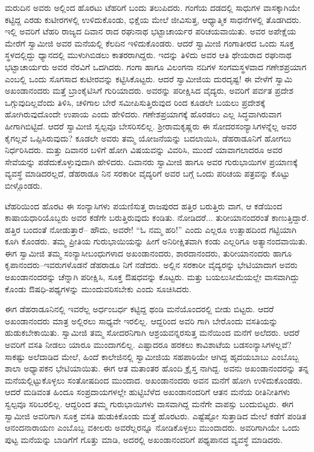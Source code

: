 ಮರುದಿನ ಅವರು ಅಲ್ಲಿಂದ ಹೊರಟು ಟೆಹರಿಗೆ ಬಂದು ತಲುಪಿದರು. ಗಂಗೆಯ ದಡದಲ್ಲಿ ಸಾಧುಗಳ ವಾಸಕ್ಕಾಗಿಯೇ ಕಟ್ಟಿದ್ದ ಎರಡು ಕುಟೀರಗಳಲ್ಲಿ ಉಳಿದುಕೊಂಡು, ಭಿಕ್ಷೆಯ ಮೇಲೆ ಜೀವಿಸುತ್ತ, ಆಧ್ಯಾತ್ಮಿಕ ಸಾಧನೆಗಳಲ್ಲಿ ತೊಡಗಿದರು. ಇಲ್ಲಿ ಅವರಿಗೆ ಟೆಹರಿ ರಾಜ್ಯದ ದಿವಾನ ರಾದ ರಘುನಾಥ ಭಟ್ಟಾಚಾರ್ಯರ ಪರಿಚಯವಾಯಿತು. ಅವರ ಅಪೇಕ್ಷೆಯ ಮೇರೆಗೆ ಸ್ವಾಮೀಜಿ ಅವರ ಮನೆಯಲ್ಲಿ ಕೆಲದಿನ ಇಳಿದುಕೊಂಡರು. ಆದರೆ ಸ್ವಾಮೀಜಿ ಗಂಗಾತೀರದ ಒಂದು ಸೂಕ್ತ ಸ್ಥಳದಲ್ಲಿದ್ದು ಧ್ಯಾನದಲ್ಲಿ ಮುಳುಗಿಬಿಡಲು ಕಾತರರಾಗಿದ್ದರು. ಇದನ್ನು ತಿಳಿದು ಅವರ ಆತಿ ಥೇಯರಾದ ರಘುನಾಥ ಭಟ್ಟಾಚಾರ್ಯರು ಅವರ ನೆರವಿಗೆ ಒದಗಿದರು. ಗಂಗಾ ಹಾಗೂ ವಿಲಂಗನಾ ನದಿಗಳ ಸಂಗಮಸ್ಥಳವಾದ ಗಣೇಶಪ್ರಯಾಗ ಎಂಬಲ್ಲಿ ಒಂದು ಸೊಗಸಾದ ಕುಟೀರವನ್ನು ಕಟ್ಟಿಸಿಕೊಟ್ಟರು. ಆದರೆ ಸ್ವಾಮೀಜಿಯ ದುರದೃಷ್ಟ! ಈ ವೇಳೆಗೆ ಸ್ವಾಮಿ ಅಖಂಡಾನಂದರು ಮತ್ತೆ ಬ್ರಾಂಕೈಟಿಸಿಗೆ ಗುರಿಯಾದರು. ಅವರನ್ನು ಪರೀಕ್ಷಿಸಿದ ವೈದ್ಯರು, ಅವರಿಗೆ ಪರ್ವತ ಪ್ರದೇಶ ಒಗ್ಗುವುದಿಲ್ಲವೆಂದು ತಿಳಿಸಿ, ಚಳಿಗಾಲ ಬೇರೆ ಸಮೀಪಿಸುತ್ತಿರುವುದ ರಿಂದ ಕೂಡಲೇ ಬಯಲು ಪ್ರದೇಶಕ್ಕೆ ಹೋಗಿರುವುದೊಂದೇ ಉಪಾಯ ಎಂದು ಹೇಳಿದರು. ಗಣೇಶಪ್ರಯಾಗಕ್ಕೆ ಹೊರಡಲು ಎಲ್ಲ ಸಿದ್ಧವಾಗಿರುವಾಗ ಹೀಗಾಗಿಬಿಟ್ಟಿದೆ. ಆದರೆ ಸ್ವಾಮೀಜಿ ಸ್ವಲ್ಪವೂ ಬೇಸರಿಸಲಿಲ್ಲ. ಶ್ರೀರಾಮಕೃಷ್ಣರು ಈ ಸೋದರಸಂನ್ಯಾಸಿಗಳನ್ನೆಲ್ಲ ಅವರ ಕೈಗಲ್ಲವೆ ಒಪ್ಪಿಸಿರುವುದು? ಕೂಡಲೇ ಅವರು ತಮ್ಮ ಯೋಜನೆಯನ್ನು ಬದಲಾಯಿಸಿ, ಡೆಹರಾಡೂನಿಗೆ ಹೋಗಲು ನಿರ್ಧರಿಸಿದರು. ಮತ್ತು ದಿವಾನರ ಬಳಿಗೆ ಹೋಗಿ ವಿಷಯವನ್ನು ವಿವರಿಸಿ, ಮುಂದೆ ಯಾವಾಗಲಾದರೂ ಅವರ ಸೇವೆಯನ್ನು ಪಡೆದುಕೊಳ್ಳುವುದಾಗಿ ಹೇಳಿದರು. ದಿವಾನರು ಸ್ವಾಮೀಜಿ ಹಾಗೂ ಅವರ ಗುರುಭಾಯಿಗಳ ಪ್ರಯಾಣಕ್ಕೆ ವ್ಯವಸ್ಥೆ ಮಾಡಿದರಲ್ಲದೆ, ಡೆಹರಾಡೂ ನಿನ ಸರಕಾರೀ ವೈದ್ಯರಿಗೆ ಅವರ ಬಗ್ಗೆ ಒಂದು ಪರಿಚಯ ಪತ್ರವನ್ನು ಕೊಟ್ಟು ಬೀಳ್ಗೊಂಡರು.

ಟೆಹರಿಯಿಂದ ಹೊರಟ ಈ ಸಂನ್ಯಾಸಿಗಳು ಪಯಣಿಸುತ್ತ ರಾಜಪುರದ ಹತ್ತಿರ ಬರುತ್ತಿರು ವಾಗ, ಆ ಕಡೆಯಿಂದ ಕಾಷಾಯಧಾರಿಯೊಬ್ಬರು ಅವರ ಕಡೆಗೇ ಬರುತ್ತಿರುವುದು ಕಂಡಿತು. ನೋಡಿದರೆ... ತುರೀಯಾನಂದರಂತೆ ಕಾಣುತ್ತಿದ್ದಾರೆ. ಹತ್ತಿರ ಬಂದಂತೆ ನೋಡುತ್ತಾರೆ– ಹೌದು, ಅವರೇ! “ಓ ನಮ್ಮ ಹರಿ!” ಎಂದು ಎಲ್ಲರೂ ಉತ್ಸಾಹದಿಂದ ಗಟ್ಟಿಯಾಗಿ ಕೂಗಿ ಕೊಂಡರು. ತಮ್ಮ ಪ್ರೀತಿಯ ಗುರುಭಾಯಿಯನ್ನು ಹೀಗೆ ಅನಿರೀಕ್ಷಿತವಾಗಿ ಕಂಡು ಎಲ್ಲರಿಗೂ ಅತ್ಯಾನಂದವಾಯಿತು. ಈಗ ಸ್ವಾಮೀಜಿ ತಮ್ಮ ಸಂನ್ಯಾಸೀಬಂಧುಗಳಾದ ಅಖಂಡಾನಂದರು, ಶಾರದಾನಂದರು, ತುರೀಯಾನಂದರು ಹಾಗೂ ಕೃಪಾನಂದರು–ಇವರುಗಳೊಡನೆ ಡೆಹರಾಡೂ ನಿಗೆ ನಡೆದರು. ಅಲ್ಲಿನ ಸರಕಾರೀ ವೈದ್ಯರನ್ನು ಭೇಟಿಯಾದಾಗ ಅವರು ಅಖಂಡಾನಂದರನ್ನು ಚೆನ್ನಾಗಿ ಪರೀಕ್ಷಿಸಿ, ಸೂಕ್ತ ಔಷಧವನ್ನು ಕೊಟ್ಟರು. ಮತ್ತು ಬಯಲುಸೀಮೆಯಲ್ಲೇ ವಾಸವಾಗಿದ್ದು ಕೊಂಡು ಔಷಧಿ-ಪಥ್ಯಗಳನ್ನು ಮುಂದುವರಿಸಬೇಕು ಎಂದು ಸೂಚಿಸಿದರು.

ಈಗ ಡೆಹರಾಡೂನಿನಲ್ಲಿ ಇವರೆಲ್ಲ ಅರ್ಧಂಬರ್ಧ ಕಟ್ಟಿದ್ದ ಥಂಡಿ ಮನೆಯೊಂದರಲ್ಲಿ ಬೀಡು ಬಿಟ್ಟರು. ಆದರೆ ಅಖಂಡಾನಂದರು ಮಾತ್ರ ಅಲ್ಲಿರಲು ಸಾಧ್ಯವೇ ಇರಲಿಲ್ಲ. ಆದ್ದರಿಂದ ಅವರಿ ಗಾಗಿ ಬೇರೊಂದು ವಸತಿಯನ್ನು ಹುಡುಕಬೇಕಾಯಿತು. ಸ್ವಾಮೀಜಿ ತಮ್ಮ ಸೋದರನಿಗಾಗಿ ಆಶ್ರಯವನ್ನರಸುತ್ತ ಮನೆಯಿಂದ ಮನೆಗೆ ಅಲೆದರು. ಆದರೆ ಅವರಿಗೆ ವಸತಿ ನೀಡಲು ಯಾರೂ ಮುಂದಾಗಲಿಲ್ಲ. ಎಷ್ಟಾದರೂ ಹರಕಲು ಕಾವಿಶಾಟೆಯ ಬಡಸಂನ್ಯಾಸಿಗಳಲ್ಲವೆ? ಸಾಕಷ್ಟು ಅಲೆದಾಡಿದ ಮೇಲೆ, ಹಿಂದೆ ಕಾಲೇಜಿನಲ್ಲಿ ಸ್ವಾಮೀಜಿಯ ಸಹಪಾಠಿಯೇ ಆಗಿದ್ದ ಹೃದಯಬಾಬು ಎಂಬೊಬ್ಬ ಶಾಲಾ ಅಧ್ಯಾಪಕನ ಭೇಟಿಯಾಯಿತು. ಈಗ ಆತ ಮತಾಂತರ ಹೊಂದಿ ಕ್ರೈಸ್ತ ನಾಗಿದ್ದ. ಅವನು ಅಖಂಡಾನಂದರನ್ನು ತನ್ನ ಮನೆಯಲ್ಲಿಟ್ಟುಕೊಳ್ಳಲು ಸಂತೋಷದಿಂದ ಮುಂದಾದ. ಅಖಂಡಾನಂದರು ಅವನ ಮನೆಗೆ ಹೋಗಿ ಉಳಿದುಕೊಂಡರು. ಆದರೆ ಮಡಿವಂತ ಹಿಂದೂ ಸಂಪ್ರದಾಯಗಳಲ್ಲೇ ಹುಟ್ಟಿಬೆಳೆದ ಅಖಂಡಾನಂದರಿಗೆ ಆತನ ಮನೆಯ ರೀತಿನೀತಿಗಳು ಸ್ವಲ್ಪವೂ ಸರಿಬರಲಿಲ್ಲ. ಆದ್ದರಿಂದ ತಮ್ಮ ಗುರುಭಾಯಿಗಳು ವಾಸವಾಗಿದ್ದ ಮನೆಗೇ ವಾಪಸ್ಸು ಬಂದುಬಿಟ್ಟರು. ಈಗ ಸ್ವಾಮೀಜಿ ಅವರಿಗಾಗಿ ಸೂಕ್ತ ವಸತಿ ಹುಡುಕಿಕೊಂಡು ಮತ್ತೆ ಹೊರಟರು. ಎಷ್ಟೆಷ್ಟೋ ಸುತ್ತಾಡಿದ ಮೇಲೆ ಕಡೆಗೆ ಪಂಡಿತ ಆನಂದನಾರಾಯಣ ಎಂಬೊಬ್ಬ ವಕೀಲರು ಅವರೆಲ್ಲರನ್ನೂ ನೋಡಿಕೊಳ್ಳಲು ಮುಂದಾದರು. ಅವರಿಗಾಗಿಯೇ ಒಂದು ಪುಟ್ಟ ಮನೆಯನ್ನು ಬಾಡಿಗೆಗೆ ಗೊತ್ತು ಮಾಡಿ, ಅದರಲ್ಲಿ ಅಖಂಡಾನಂದರಿಗೆ ಪಥ್ಯಪಾನದ ವ್ಯವಸ್ಥೆ ಮಾಡಿದರು.


